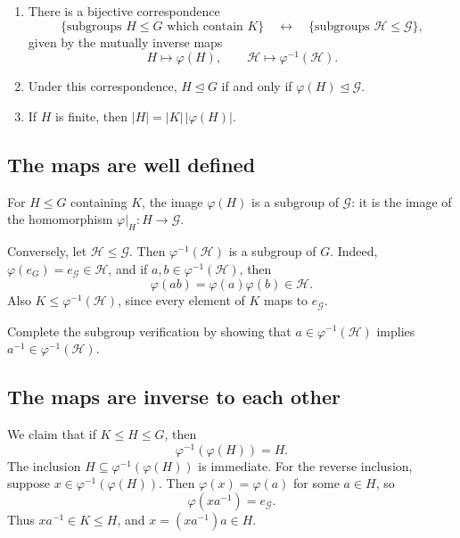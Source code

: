 \documentclass[reqno,11pt]{amsart}
\begin{document}
\begin{theorem}\label{thm:correspondence}
\leavevmode
\begin{enumerate}[label=\textbf{(\arabic*)}]
  \item There is a bijective correspondence
  \[
    \{\text{subgroups } H\leq G \text{ which contain } K \}\quad\longleftrightarrow\quad
    \{\text{subgroups } \mathcal H\leq\mathcal G\},
  \]
  given by the mutually inverse maps
  \[
    H\longmapsto\varphi(H),\qquad
    \mathcal H\longmapsto\varphi^{-1}(\mathcal H).
  \]
  \item Under this correspondence,
  $H\trianglelefteq G$ if and only if
  $\varphi(H)\trianglelefteq\mathcal G$.
  \item If $H$ is finite, then $|H|=|K|\,|\varphi(H)|$.
\end{enumerate}
\end{theorem}


\subsection{The maps are well defined}

For $H\leq G$ containing $K$, the image $\varphi(H)$ is a subgroup of
$\mathcal G$: it is the image of the homomorphism
$\varphi|_H:H\to\mathcal G$.

Conversely, let $\mathcal H\leq\mathcal G$. Then
$\varphi^{-1}(\mathcal H)$ is a subgroup of $G$. Indeed,
$\varphi(e_G)=e_{\mathcal G}\in\mathcal H$, and if
$a,b\in\varphi^{-1}(\mathcal H)$, then
\[
  \varphi(ab)=\varphi(a)\varphi(b)\in\mathcal H.
\]
Also $K\leq\varphi^{-1}(\mathcal H)$, since every element of $K$ maps to
$e_{\mathcal G}$.

\begin{exercise}
Complete the subgroup verification by showing that
$a\in\varphi^{-1}(\mathcal H)$ implies
$a^{-1}\in\varphi^{-1}(\mathcal H)$.
\end{exercise}

\subsection{The maps are inverse to each other}

We claim that if $K\leq H\leq G$, then
\begin{equation}\label{eq:preimage-image}
  \varphi^{-1}(\varphi(H))=H.
\end{equation}
The inclusion $H\subseteq\varphi^{-1}(\varphi(H))$ is immediate.
For the reverse inclusion, suppose
$x\in\varphi^{-1}(\varphi(H))$. Then $\varphi(x)=\varphi(a)$ for some
$a\in H$, so
\[
  \varphi(xa^{-1})=e_{\mathcal G}.
\]
Thus $xa^{-1}\in K\leq H$, and $x=(xa^{-1})a\in H$.
\end{document}
